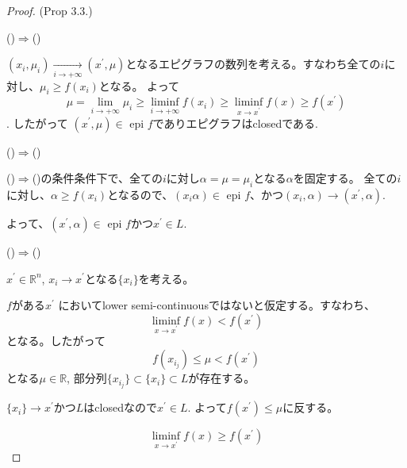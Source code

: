 \documentclass[12pt]{jsarticle}
\begin{document}
\begin{proof}(Prop 3.3.)

()$\Rightarrow$()

$(x_i, \mu_i)\xrightarrow[i \rightarrow + \infty]{}(x^{\prime}, \mu)$となるエピグラフの数列を考える。すなわち全ての$i$に対し、$\mu_i  \ge f(x_i)$となる。
よって
\[
\mu = \lim_{i \rightarrow + \infty} \mu_i \ge \liminf_{i \rightarrow + \infty} {f(x_i)} \ge \liminf_{x \rightarrow x^{\prime}}{f(x)} \ge f(x^{\prime})
\].
したがって $(x^{\prime},  \mu) \in$ epi $f$でありエピグラフはclosedである.

()$\Rightarrow$()

()$\Rightarrow$()の条件条件下で、全ての$i$に対し$\alpha = \mu = \mu_i$となる$\alpha$を固定する。
全ての$i$に対し、$\alpha \ge f(x_i)$となるので、$(x_i  \alpha) \in$ epi $f$、かつ$(x_i, \alpha)\rightarrow(x^{\prime}, \alpha)$.

よって、$(x^{\prime},  \alpha) \in$ epi $f$かつ$x^{\prime} \in L$.


()$\Rightarrow$()

$x^{\prime} \in \mathbb{R}^n$, $x_i \rightarrow x^{\prime}$となる$\{x_i\}$を考える。

$f$がある$x^{\prime}$ においてlower semi-continuousではないと仮定する。すなわち、 
\[
\liminf_{x \to x^{\prime}} {f(x)} < f(x^{\prime})
\]
となる。したがって
\[
f(x_{i_j}) \le \mu < f(x^{\prime})
\]
となる$\mu \in \mathbb{R}$, 部分列$\{x_{i_j}\} \subset \{x_i\}  \subset L$が存在する。

$\{x_{i}\} \rightarrow x^{\prime}$かつ$L$はclosedなので$x^{\prime} \in L$.
よって$f(x^{\prime}) \le \mu$に反する。

\[
\liminf_{x \to x^{\prime}} {f(x)} \ge f(x^{\prime})
\]

\end{proof}
\end{document}
